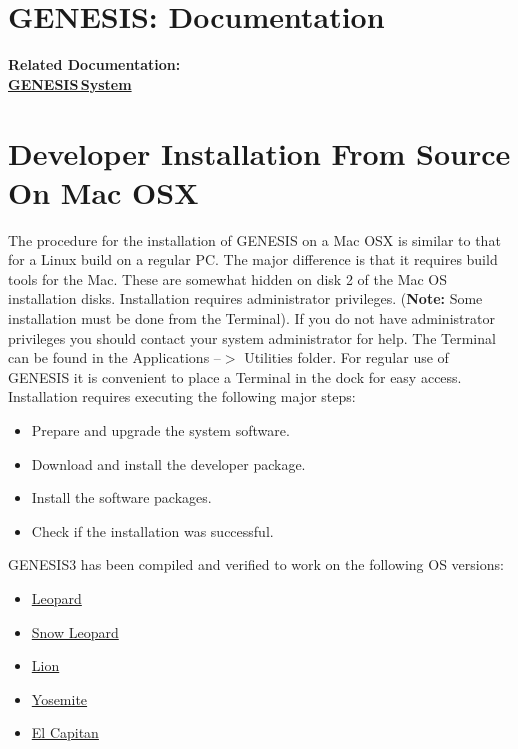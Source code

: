 \documentclass[12pt]{article}
\begin{document}
\section*{GENESIS: Documentation}

{\bf Related Documentation:} \\
\href{../genesis-system/genesis-system.tex}{\bf GENESIS\,System}


\section*{Developer Installation From Source On Mac OSX}

The procedure for the installation of GENESIS on a Mac OSX is similar to that for a Linux build on a regular PC. The major difference is that it requires build tools for the Mac. These are somewhat hidden on disk 2 of the Mac OS installation disks. Installation requires administrator privileges. ({\bf Note:} Some installation must be done from the Terminal). If you do not have administrator privileges you should contact your system administrator for help. The Terminal can be found in the Applications --$>$ Utilities folder. For regular use of GENESIS it is convenient to place a Terminal in the dock for easy access.
Installation requires executing the following major steps:
\begin{itemize}
   \item[] Prepare and upgrade the system software.
   \item[] Download and install the developer package.
   \item[] Install the software packages.
   \item[] Check if the installation was successful. 
\end{itemize}

GENESIS3 has been compiled and verified to work on the following OS versions:

\begin{itemize}
 \item[] \href{../installation-osx-leopard/installation-osx-leopard.tex}{Leopard}
 \item[] \href{../installation-osx-snow-leopard/installation-osx-snow-leopard.tex}{Snow Leopard}
 \item[] \href{../installation-osx-lion/installation-osx-lion.tex}{Lion}
 \item[] \href{../installation-osx-yosemite/installation-osx-yosemite.tex}{Yosemite}
 \item[] \href{../installation-osx-elcapitan/installation-osx-elcapitan.tex}{El Capitan}
\end{itemize}
\end{document}
